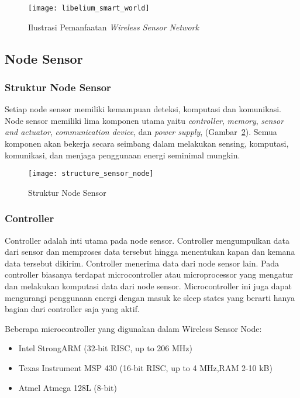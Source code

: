 \begin{figure} [H]
	\centering  
	\texttt{[image: libelium\_smart\_world]}  
	\caption[Ilustrasi Pemanfaatan \textit{Wireless Sensor Network}]{Ilustrasi Pemanfaatan \textit{Wireless Sensor Network}} 
	\label{fig:smartworld} 
\end{figure} 

\subsection{Node Sensor}
\subsubsection{Struktur Node Sensor}
Setiap node sensor memiliki kemampuan deteksi, komputasi dan komunikasi. Node sensor memiliki lima komponen utama yaitu \textit{controller}, \textit{memory}, \textit{sensor and actuator}, \textit{communication device}, dan \textit{power supply}, (Gambar~\ref{fig:structure_sensor_node}). Semua komponen akan bekerja secara seimbang dalam melakukan sensing, komputasi, komunikasi, dan menjaga penggunaan energi seminimal mungkin. 

\begin{figure} [H]
	\centering  
	\texttt{[image: structure\_sensor\_node]}  
	\caption[Struktur Node Sensor]{Struktur Node Sensor} 
	\label{fig:structure_sensor_node} 
\end{figure} 

\subsubsection{Controller}
Controller adalah inti utama pada node sensor. Controller mengumpulkan data dari sensor dan memproses data tersebut hingga menentukan kapan dan kemana data tersebut dikirim. Controller menerima data dari node sensor lain. Pada controller biasanya terdapat microcontroller atau microprocessor yang mengatur dan melakukan komputasi data dari node sensor. Microcontroller ini juga dapat mengurangi penggunaan energi dengan masuk ke sleep states yang berarti hanya bagian dari controller saja yang aktif.

Beberapa microcontroller yang digunakan dalam Wireless Sensor Node:
\begin{itemize}
	\item Intel StrongARM (32-bit RISC, up to 206 MHz)
	\item Texas Instrument MSP 430 (16-bit RISC, up to 4 MHz,RAM 2-10 kB)
	\item Atmel Atmega 128L (8-bit)
\end{itemize}

